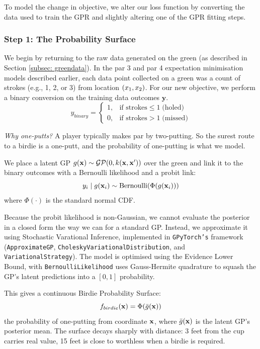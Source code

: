 \documentclass[11pt, letterpaper]{article}
\begin{document}
To model the change in objective, we alter our loss function by converting the data used to train the GPR and slightly altering one of the GPR fitting steps.



\subsubsection{Step 1: The Probability Surface}
We begin by returning to the raw data generated on the green (as described in Section \ref{subsec: greendata}). In the par 3 and par 4 expectation minimisation models described earlier, each data point collected on a green was a count of strokes (e.g., 1, 2, or 3) from location $(x_1, x_2)$. For our new objective, we perform a binary conversion on the training data outcomes $\mathbf{y}$. 
\[y_{binary} = \begin{cases}
1, & \text{if strokes} \le 1 \;\text{(holed)} \\
0, & \text{if strokes} > 1 \;\text{(missed)}
\end{cases}\]

\textit{Why one-putts?} A player typically makes par by two-putting. So the surest route to a birdie is a one-putt, and the probability of one-putting is what we model.

We place a latent GP $g(\mathbf{x}) \sim \mathcal{GP}(0, k(\mathbf{x},\mathbf{x}'))$ over the green and link it to the binary outcomes with a Bernoulli likelihood and a probit link:
\[y_i \mid g(\mathbf{x}_i) \sim \text{Bernoulli}(\Phi(g(\mathbf{x}_i)))\]
where $\Phi(\cdot)$ is the standard normal CDF.

Because the probit likelihood is non-Gaussian, we cannot evaluate the posterior in a closed form the way we can for a standard GP. Instead, we approximate it using Stochastic Varational Inference, implemented in \texttt{GPyTorch's} framework (\texttt{ApproximateGP}, \texttt{CholeskyVariationalDistribution}, and \texttt{VariationalStrategy}). The model is optimised using the Evidence Lower Bound, with \texttt{BernoulliLikelihood} uses Gauss-Hermite quadrature to squash the GP's latent predictions into a $[0,1]$ probability.

This gives a continuous Birdie Probability Surface:
\[f_{birdie}(\mathbf{x}) = \Phi(\bar g(\mathbf{x}))\]
the probability of one-putting from coordinate $\mathbf{x}$, where $\bar g(\mathbf{x})$ is the latent GP's posterior mean. The surface decays sharply with distance: 3 feet from the cup carries real value, 15 feet is close to worthless when a birdie is required. 
\end{document}
